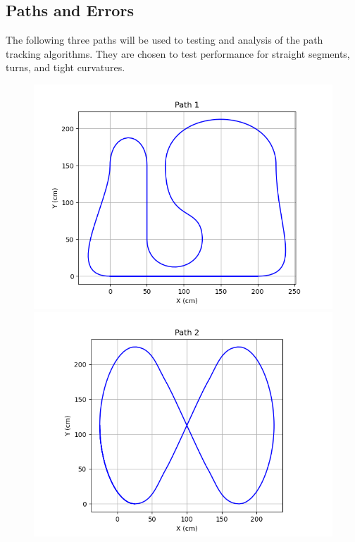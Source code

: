 \documentclass[12pt]{article}
\begin{document}
\begin{flushleft}
\newpage

\subsection{Paths and Errors}

The following three paths will be used to testing and analysis of the path tracking algorithms. They are chosen to test performance for straight segments, turns, and tight curvatures.

\begin{figure}[H]
\includegraphics[width=\linewidth]{images/pathData/path1}
\label{img:path1}
\endminipage\hfill
{}
\includegraphics[width=\linewidth]{images/pathData/path2}

\end{figure}
\end{flushleft}
\end{document}
